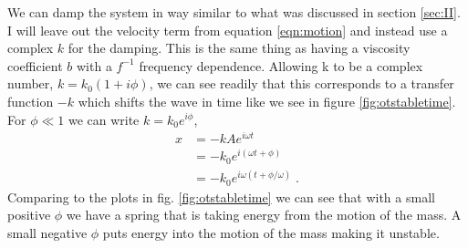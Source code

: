 We can damp the system in way similar to what was discussed in section
\ref{sec:II}. I will leave out the velocity term from equation
\ref{eqn:motion} and instead use a complex $k$ for the damping.
This is the same thing as having a viscosity coefficient $b$ with a $f^{-1}$
frequency dependence.
Allowing k to be a complex number, $k = k_0(1+i\phi)$,
we can see readily that this corresponds to a transfer function $-k$ which
shifts the wave in time like we see in figure \ref{fig:otstabletime}.
For $\phi \ll 1$ we can write $k=k_0e^{i\phi}$,
\begin{align}
x &= -kAe^{i\omega t} \nonumber \\
  &= -k_0e^{i(\omega t + \phi)} \nonumber \\
  &= -k_0e^{i\omega(t + \phi/\omega)} \;.
\end{align}
Comparing to the plots in fig. \ref{fig:otstabletime} we can see that with a
small positive $\phi$ we have a spring that is taking energy from the motion
of the mass. A small negative $\phi$ puts energy into the motion of the mass
making it unstable.



